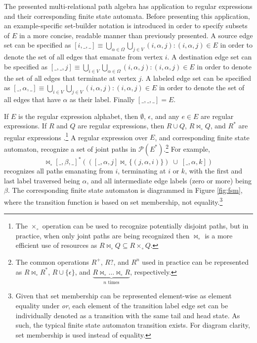 \documentclass[10pt,conference,letterpaper]{IEEEtran}
\newcommand{\mca}{\mathcal}
\newcommand{\join}{\bowtie_\circ}
\newcommand{\disjoin}{\times_\circ}
\begin{document}
The presented multi-relational path algebra has application to regular expressions and their corresponding finite state automata. Before presenting this application, an example-specific set-builder notation is introduced in order to specify subsets of $E$ in a more concise, readable manner than previously presented. A source edge set can be specified as $[i,\_,\_] \equiv \bigcup_{\alpha \in \Omega} \bigcup_{j \in V} (i,\alpha,j) : (i,\alpha,j) \in E$ in order to denote the set of all edges that emanate from vertex $i$. A destination edge set can be specified as $[\_,\_,j] \equiv \bigcup_{i \in V} \bigcup_{\alpha \in \Omega} (i,\alpha,j) : (i,\alpha,j) \in E$ in order to denote the set of all edges that terminate at vertex $j$. A labeled edge set can be specified as $[\_,\alpha,\_] \equiv \bigcup_{i \in V} \bigcup_{j \in V} (i,\alpha,j) : (i,\alpha,j) \in E$ in order to denote the set of all edges that have $\alpha$ as their label. Finally $[\_,\_,\_] = E$.

If $E$ is the regular expression alphabet, then $\emptyset$, $\epsilon$, and any $e \in E$ are regular expressions. If $R$ and $Q$ are regular expressions, then $R \cup Q$, $R \join Q$, and $R^*$ are regular expressions \cite{comput:moret1997}.\footnote{The $\disjoin$ operation can be used to recognize potentially disjoint paths, but in practice, when only joint paths are being recognized then $\join$ is a more efficient use of resources as $R \join Q \subseteq R \disjoin Q$.} A regular expression over $E$, and corresponding finite state automaton, recognize a set of joint paths in $\mca{P}(E^*)$.\footnote{The common operations $R^+$, $R?$, and $R^n$ used in practice can be represented as $R \join R^*$, $R \cup \{\epsilon\}$, and $\underbrace{R \join \ldots \join R}_{n \text{ times}}$, respectively.} For example,
\begin{equation*}
[i,\alpha,\_] \join [\_, \beta, \_]^* \left(\left([\_, \alpha, j] \join \{(j,\alpha,i)\}\right) \; \cup \; [\_, \alpha, k]\right)
\end{equation*}
recognizes all paths emanating from $i$, terminating at $i$ or $k$, with the first and last label traversed being $\alpha$, and all intermediate edge labels (zero or more) being $\beta$. The corresponding finite state automaton is diagrammed in Figure \ref{fig:fsm}, where the transition function is based on set membership, not equality.\footnote{Given that set membership can be represented element-wise as element equality under \textit{or}, each element of the transition label edge set can be individually denoted as a transition with the same tail and head state. As such, the typical finite state automaton transition exists. For diagram clarity, set membership is used instead of equality.} 
\end{document}

